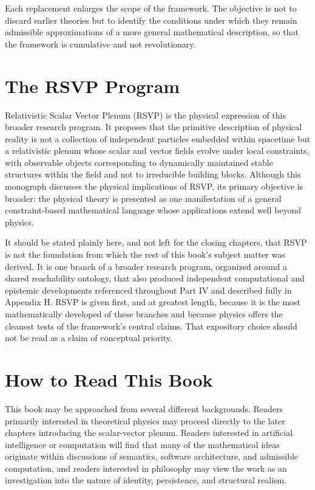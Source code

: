\documentclass[11pt,oneside]{book}
\numberwithin{equation}{chapter}
\theoremstyle{definition}
\theoremstyle{plain}
\begin{document}
Each replacement enlarges the scope of the framework. The objective is not to discard earlier theories but to identify the conditions under which they remain admissible approximations of a more general mathematical description, so that the framework is cumulative and not revolutionary.

\section{The RSVP Program}

Relativistic Scalar Vector Plenum (RSVP) is the physical expression of this broader research program. It proposes that the primitive description of physical reality is not a collection of independent particles embedded within spacetime but a relativistic plenum whose scalar and vector fields evolve under local constraints, with observable objects corresponding to dynamically maintained stable structures within the field and not to irreducible building blocks. Although this monograph discusses the physical implications of RSVP, its primary objective is broader: the physical theory is presented as one manifestation of a general constraint-based mathematical language whose applications extend well beyond physics.

It should be stated plainly here, and not left for the closing chapters, that RSVP is not the foundation from which the rest of this book's subject matter was derived. It is one branch of a broader research program, organized around a shared reachability ontology, that also produced independent computational and epistemic developments referenced throughout Part IV and described fully in Appendix H. RSVP is given first, and at greatest length, because it is the most mathematically developed of these branches and because physics offers the cleanest tests of the framework's central claims. That expository choice should not be read as a claim of conceptual priority.

\section{How to Read This Book}

This book may be approached from several different backgrounds. Readers primarily interested in theoretical physics may proceed directly to the later chapters introducing the scalar-vector plenum. Readers interested in artificial intelligence or computation will find that many of the mathematical ideas originate within discussions of semantics, software architecture, and admissible computation, and readers interested in philosophy may view the work as an investigation into the nature of identity, persistence, and structural realism.
\end{document}
